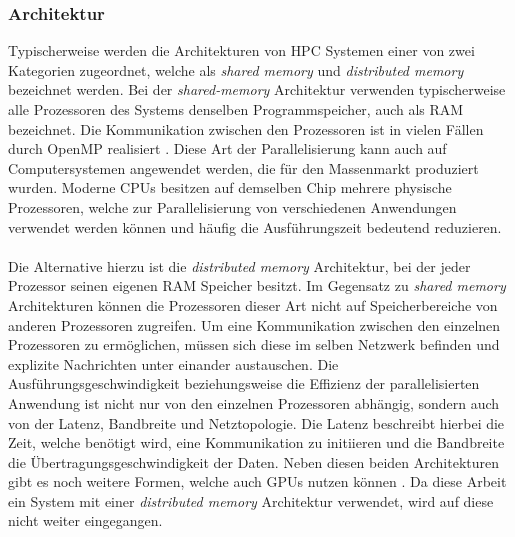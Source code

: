 \subsubsection{Architektur}
\label{subsubsec:hpc_architecture}
Typischerweise werden die Architekturen von \ac{HPC} Systemen einer von zwei Kategorien zugeordnet, welche als \emph{shared memory} und \emph{distributed memory} bezeichnet werden. Bei der \emph{shared-memory} Architektur verwenden typischerweise alle Prozessoren des Systems denselben Programmspeicher, auch als \ac{RAM} bezeichnet. Die Kommunikation zwischen den Prozessoren ist in vielen Fällen durch \ac{OpenMP} realisiert \cite{nielsen2016introduction}. Diese Art der Parallelisierung kann auch auf Computersystemen angewendet werden, die für den Massenmarkt produziert wurden. Moderne \acp{CPU} besitzen auf demselben Chip mehrere physische Prozessoren, welche zur Parallelisierung von verschiedenen Anwendungen verwendet werden können und häufig die Ausführungszeit bedeutend reduzieren. 
\\\\
Die Alternative hierzu ist die \emph{distributed memory} Architektur, bei der jeder Prozessor seinen eigenen \ac{RAM} Speicher besitzt. Im Gegensatz zu \emph{shared memory} Architekturen können die Prozessoren dieser Art nicht auf Speicherbereiche von anderen Prozessoren zugreifen. Um eine Kommunikation zwischen den einzelnen Prozessoren zu ermöglichen, müssen sich diese im selben Netzwerk befinden und explizite Nachrichten unter einander austauschen. Die Ausführungsgeschwindigkeit beziehungsweise die Effizienz der parallelisierten Anwendung ist nicht nur von den einzelnen Prozessoren abhängig, sondern auch von der Latenz, Bandbreite und Netztopologie. Die Latenz beschreibt hierbei die Zeit, welche benötigt wird, eine Kommunikation zu initiieren und die Bandbreite die Übertragungsgeschwindigkeit der Daten. Neben diesen beiden Architekturen gibt es noch weitere Formen, welche auch \acp{GPU} nutzen können \cite{nielsen2016introduction}. Da diese Arbeit ein System mit einer \emph{distributed memory} Architektur verwendet, wird auf diese nicht weiter eingegangen.


